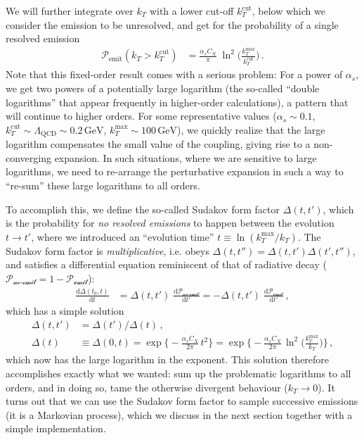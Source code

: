 \documentclass[11pt]{article}
\begin{document}
We will further integrate over \(k_T\) with a lower cut-off \(k_T^\mathrm{cut}\), below which we consider the emission to be unresolved, and get for the probability of a single resolved emission
\begin{align}
  \mathcal{P}_\text{emit}(k_T>k_T^\mathrm{cut})
  &=
  \frac{\alpha_s C_X}{\pi} \; \ln^2\biggl(\frac{k_T^\mathrm{max}}{k_T^\mathrm{cut}}\biggr)
  \,.
\end{align}
Note that this fixed-order result comes with a serious problem: For a power of \(\alpha_s\), we get two powers of a potentially large logarithm (the so-called ``double logarithms'' that appear frequently in higher-order calculations), a pattern that will continue to higher orders.
For some representative values (\(\alpha_s \sim 0.1\), \(k_T^\mathrm{cut} \sim \Lambda_\mathrm{QCD} \sim 0.2\,\mathrm{GeV}\), \(k_T^\mathrm{max} \sim 100\,\mathrm{GeV}\)), we quickly realize that the large logarithm compensates the small value of the coupling, giving rise to a non-converging expansion.
In such situations, where we are sensitive to large logarithms, we need to re-arrange the perturbative expansion in such a way to ``re-sum'' these large logarithms to all orders.

To accomplish this, we define the so-called Sudakov form factor \(\Delta(t,t')\), which is the probability for \emph{no resolved emissions} to happen between the evolution \(t \to t'\), where we introduced an ``evolution time'' \(t\equiv\ln(k_T^\mathrm{max}/k_T)\).
The Sudakov form factor is \emph{multiplicative}, i.e. obeys \(\Delta(t,t'') = \Delta(t,t') \Delta(t',t'')\), and satisfies a differential equation reminiscent of that of radiative decay (\(\mathcal{P_\text{no-emit}} = 1-\mathcal{P_\text{emit}}\)):
\begin{align}
\label{eq:Dsud}
  \frac{\mathrm{d}\Delta(t_0,t)}{\mathrm{d}t}
  &=
  \Delta(t,t') \; \frac{\mathrm{d}\mathcal{P_\text{no-emit}}}{\mathrm{d}t'}
  =
  - \Delta(t,t') \; \frac{\mathrm{d}\mathcal{P_\text{emit}}}{\mathrm{d}t'}
  \,,
\end{align}
which has a simple solution
\begin{align}
\label{eq:sud}
  \Delta(t,t')
  &=
  \Delta(t') / \Delta(t)
  \,,\nonumber\\
  \Delta(t)
  &\equiv \Delta(0,t)
  =
  \exp\biggl\{-\frac{\alpha_s C_X}{2\pi} \, t^2 \biggr\}
  =
  \exp\biggl\{-\frac{\alpha_s C_X}{2\pi} \, \ln^2\biggl(\frac{k_T^\mathrm{max}}{k_T}\biggr) \biggr\}
  \,,
\end{align}
which now has the large logarithm in the exponent.
This solution therefore accomplishes exactly what we wanted: sum up the problematic logarithms to all orders, and in doing so, tame the otherwise divergent behaviour (\(k_T\to0\)).
It turns out that we can use the Sudakov form factor to sample successive emissions (it is a Markovian process), which we discuss in the next section together with a simple implementation.
\end{document}
